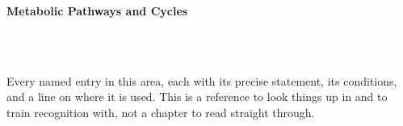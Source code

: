 



\makeindex[title={Index of This Volume},columns=2,intoc]

\begin{titlepage}\thispagestyle{empty}
\vspace*{0.14\textheight}
\noindent{\color{tiercat}\rule{\textwidth}{5pt}}\\[3pt]
\noindent{\color{bioline}\rule{\textwidth}{1pt}}\\[26pt]
\\[12pt]
\noindent\begin{minipage}{\textwidth}\raggedright
{\sffamily\bfseries\fontsize{28}{32}\selectfont\color{bioink}%
 \hyphenchar{} Metabolic Pathways and Cycles\par}\end{minipage}\\[16pt]
\noindent{\color{biogreen}\rule{\textwidth}{1.4pt}}\\[10pt]
\noindent\begin{minipage}{\textwidth}\raggedright
{\fontsize{10.5}{14}\selectfont\color{biogreen}%
Every named entry in this area, each with its precise statement, its conditions, and a line on
where it is used. This is a reference to look things up in and to train recognition with, not a
chapter to read straight through.\par}\end{minipage}
\vfill
\noindent{\color{bioline}\rule{\textwidth}{1pt}}\\[3pt]
\noindent{\color{tiercat}\rule{\textwidth}{5pt}}
\end{titlepage}
\tableofcontents
\clearpage
{}
\clearpage
\printindex

